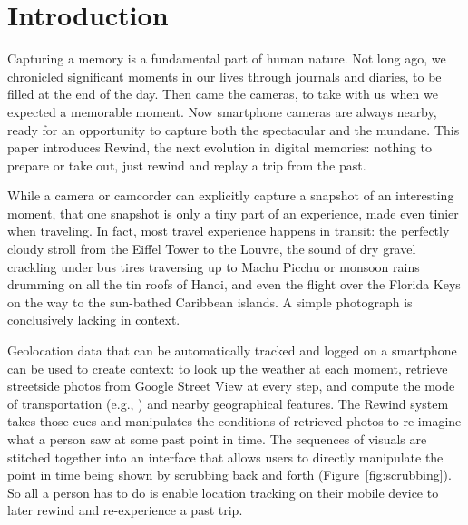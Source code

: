 \documentclass{sigchi}
\begin{document}


\section{Introduction}

Capturing a memory is a fundamental part of human nature. Not long ago, we chronicled significant moments in our lives through journals and diaries, to be filled at the end of the day. Then came the cameras, to take with us when we expected a memorable moment. Now smartphone cameras are always nearby, ready for an opportunity to capture both the spectacular and the mundane. This paper introduces Rewind, the next evolution in digital memories: nothing to prepare or take out, just rewind and replay a trip from the past.
 
While a camera or camcorder can explicitly capture a snapshot of an interesting moment, that one snapshot is only a tiny part of an experience, made even tinier when traveling. In fact, most travel experience happens in transit: the perfectly cloudy stroll from the Eiffel Tower to the Louvre, the sound of dry gravel crackling under bus tires traversing up to Machu Picchu or monsoon rains drumming on all the tin roofs of Hanoi, and even the flight over the Florida Keys on the way to the sun-bathed Caribbean islands. A simple photograph is conclusively lacking in context.
 
Geolocation data that can be automatically tracked and logged on a smartphone can be used to create context: to look up the weather at each moment, retrieve streetside photos from Google Street View at every step, and compute the mode of transportation (e.g., \cite{zheng2008learning}) and nearby geographical features. The Rewind system takes those cues and manipulates the conditions of retrieved photos to re-imagine what a person saw at some past point in time. The sequences of visuals are stitched together into an interface that allows users to directly manipulate the point in time being shown by scrubbing back and forth (Figure~\ref{fig:scrubbing}). So all a person has to do is enable location tracking on their mobile device to later rewind and re-experience a past trip.
\end{document}

